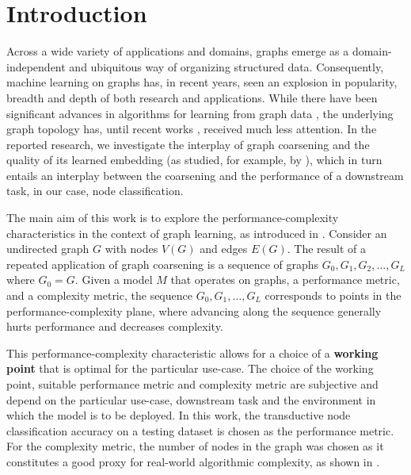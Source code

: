 \section{Introduction}
Across a wide variety of applications and domains, graphs emerge as a domain-independent and ubiquitous way of organizing structured data. Consequently, machine learning on graphs has, in recent years, seen an explosion in popularity, breadth and depth of both research and applications. While there have been significant advances in algorithms for learning from graph data \cite{defferrard_convolutional_2016,kipf_semi-supervised_2017}, the underlying graph topology has, until recent works \cite{topping_understanding_2021,velickovic_geometric_2021}, received much less attention. In the reported research, we investigate the interplay of graph coarsening and the quality of its learned embedding (as studied, for example, by \cite{akyildiz_understanding_2020,makarov_survey_2021}), which in turn entails an interplay between the coarsening and the performance of a downstream task, in our case, node classification.

The main aim of this work is to explore the performance-complexity characteristics in the context of graph learning, as introduced in \cite{prochazka_downstream_2022}. Consider an undirected graph \( G \) with nodes \( V \left( G \right) \) and edges \( E \left( G \right) \). The result of a repeated application of graph coarsening is a sequence of graphs \( G_0, G_1, G_2, \dots, G_L \) where \( G_0 = G \).
Given a model \( M \) that operates on graphs, a performance metric, and a complexity metric, the sequence \( G_0, G_1, \dots, G_L \) corresponds to points in the performance-complexity plane, where advancing along the sequence generally hurts performance and decreases complexity.

This performance-complexity characteristic allows for a choice of a \textbf{working point} that is optimal for the particular use-case. The choice of the working point, suitable performance metric and complexity metric are subjective and depend on the particular use-case, downstream task and the environment in which the model is to be deployed. In this work, the transductive node classification accuracy on a testing dataset is chosen as the performance metric. For the complexity metric, the number of nodes in the graph was chosen as it constitutes a good proxy for real-world algorithmic complexity, as shown in \cite{chiang_cluster-gcn_2019}.


